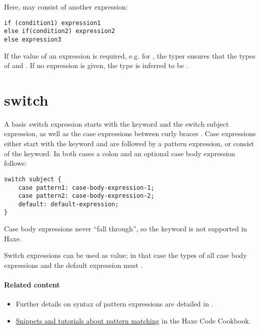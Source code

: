 Here,  may consist of another  expression:

\begin{lstlisting}
if (condition1) expression1
else if(condition2) expression2
else expression3
\end{lstlisting}

If the value of an  expression is required, e.g. for , the typer ensures that the types of  and  . If no  expression is given, the type is inferred to be .


\section{switch}
\label{expression-switch}

A basic switch expression starts with the  keyword and the switch subject expression, as well as the case expressions between curly braces \expr{\{\}}. Case expressions either start with the  keyword and are followed by a pattern expression, or consist of the  keyword. In both cases a colon \expr{:} and an optional case body expression follows:

\begin{lstlisting}
switch subject {
	case pattern1: case-body-expression-1;
	case pattern2: case-body-expression-2;
	default: default-expression;
}
\end{lstlisting}

Case body expressions never ``fall through'', so the  keyword is not supported in Haxe.

Switch expressions can be used as value; in that case the types of all case body expressions and the default expression must .

\paragraph{Related content}
\begin{itemize}
	\item Further details on syntax of pattern expressions are detailed in .
	\item \href{http://code.haxe.org/tag/pattern-matching.html}{Snippets and tutorials about pattern matching} in the Haxe Code Cookbook.
\end{itemize}


